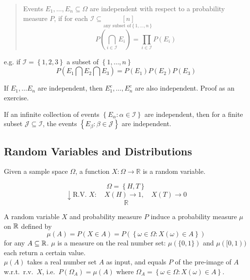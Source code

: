 


\begin{quote}
    Events $E_1, \dots, E_n \subseteq \Omega$ are independent with respect to a probability measure $P$, if for each $\mathcal{I} \subseteq \underset{\text{any subset of} \left\{1, \dots, n\right\}}{[n]}$
    \[P\left(\bigcap_{i\in\mathcal{I}}E_i\right) = \prod_{i\in\mathcal{I}}P(E_i)\]
\end{quote}
e.g. if $\mathcal{I} = \left\{1,2,3\right\}$ a subset of $\left\{1,\dots,n\right\}$
\[P(E_1 \bigcap E_2 \bigcap E_3) = P(E_1)P(E_2)P(E_3)\]

\begin{reqproof}
\begin{proposition}[][2.7.1]
    If $E_1, \dots E_n$ are independent, then $E_1^c, \dots, E_n^c$ are also independent. Proof as an exercise.
\end{proposition}
\end{reqproof}

\begin{reqnoproof}
\begin{proposition}[][2.7.2]
    If an infinite collection of events $\left\{E_\alpha :\alpha \in \mathcal{I}\right\}$ are independent, then for a finite subset $\mathcal{J} \subseteq \mathcal{I}$, the events $\left\{E_\beta : \beta \in \mathcal{J}\right\}$ are independent.
\end{proposition}
\end{reqnoproof}

\subsection{Random Variables and Distributions}
\begin{definition}
    Given a sample space $\Omega$, a function $X: \Omega \rightarrow \mathbb{R}$ is a random variable.
\end{definition}

\begin{example}
    \[\Omega = \left\{H, T\right\}\]
    \[\downarrow \text{R.V. } X: \quad X(H)\rightarrow 1, \quad X(T)\rightarrow 0 \]
    \[\mathbb{R}\]
\end{example}

\begin{theorem}[Distribution][3.2]
    A random variable $X$ and probability measure $P$ induce a probability measure $\mu$ on $\mathbb{R}$ defined by
    \[\mu(A) = P(X \in A) = P(\left\{\omega\in \Omega: X(\omega)\in A\right\})\]
    for any $A \subseteq \mathbb{R}$.
    $\mu$ is a measure on the real number set: $\mu(\{0,1\})$ and $\mu([0,1))$ each return a certain value.
    \\ $\mu(A)$ takes a real number set $A$ as input, and equals $P$ of the pre-image of $A$ w.r.t.\ r.v.\ $X$, i.e.\ $P(\Omega_A) = \mu(A)$ where $\Omega_A = \left\{\omega\in\Omega: X(\omega)\in A\right\}$.
\end{theorem}

